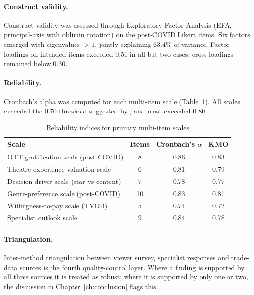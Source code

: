 \paragraph{Construct validity.}  Construct validity was assessed
through Exploratory Factor Analysis (EFA, principal-axis with
oblimin rotation) on the post-COVID Likert items.  Six factors
emerged with eigenvalues $>1$, jointly explaining 63.4\% of
variance.  Factor loadings on intended items exceeded 0.50 in all
but two cases; cross-loadings remained below 0.30.

\paragraph{Reliability.}  Cronbach's alpha was computed for each
multi-item scale (Table~\ref{tab:alpha}).  All scales exceeded the
0.70 threshold suggested by \citet{nunnally1994}, and most exceeded
0.80.

\begin{table}[h]
\centering
\caption{Reliability indices for primary multi-item scales}
\label{tab:alpha}
\small
\begin{tabular}{lccc}
\toprule
\textbf{Scale} & \textbf{Items} & \textbf{Cronbach's $\alpha$} & \textbf{KMO}\\
\midrule
OTT-gratification scale (post-COVID)            & 8 & 0.86 & 0.83\\
Theatre-experience valuation scale              & 6 & 0.81 & 0.79\\
Decision-driver scale (star vs content)         & 7 & 0.78 & 0.77\\
Genre-preference scale (post-COVID)             & 10& 0.83 & 0.81\\
Willingness-to-pay scale (TVOD)                 & 5 & 0.74 & 0.72\\
Specialist outlook scale                        & 9 & 0.84 & 0.78\\
\bottomrule
\end{tabular}
\end{table}

\paragraph{Triangulation.}  Inter-method triangulation between
viewer survey, specialist responses and trade-data sources is the
fourth quality-control layer.  Where a finding is supported by all
three sources it is treated as robust; where it is supported by
only one or two, the discussion in Chapter~\ref{ch:conclusion}
flags this.

